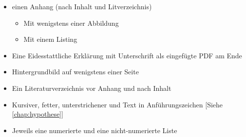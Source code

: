 \begin{itemize}
\begin{itemize}
\begin{itemize}
                \end{itemize}
        \end{itemize}
    \item einen Anhang (nach Inhalt und Litverzeichnis)
        \begin{itemize}
            \item Mit wenigstens einer Abbildung 
            \item Mit einem Listing 
        \end{itemize}
    \item Eine Eidesstattliche Erklärung mit Unterschrift als eingefügte PDF am Ende
    \item Hintergrundbild auf wenigstens einer Seite 
    \item Ein Literaturverzeichnis vor Anhang und nach Inhalt
    \item Kursiver, fetter, unterstrichener und Text in Anführungszeichen 
            [Siehe  \ref{chap:hypothese}]
    \item Jeweils eine numerierte und eine nicht-numerierte Liste
\end{itemize}
